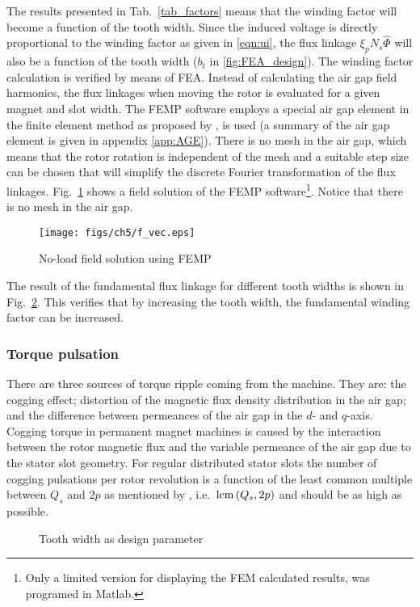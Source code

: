 The results presented in Tab.~\ref{tab_factors} means that the winding factor will become a function of the tooth width. Since the induced voltage is directly proportional to the winding factor as given in \eqref{eqn:ui}, the flux linkage $\xi_p N_s \hat{\Phi}$ will also be a function of the tooth width ($b_t$ in \ref{fig:FEA_design}). The winding factor calculation is verified by means of FEA. Instead of calculating the air gap field harmonics, the flux linkages when moving the rotor is evaluated for a given magnet and slot width. The FEMP software employs a special air gap element in the finite element method as proposed by \cite{razek_1981}, is used (a summary of the air gap element is given in appendix \ref{app:AGE}). There is no mesh in the air gap, which means that the rotor rotation is independent of the mesh and a suitable step size can be chosen that will simplify the discrete Fourier transformation of the flux linkages. Fig.~\ref{fig:fieldsol} shows a field solution of the FEMP software\footnote{Only a limited version for displaying the FEM calculated results, was programed in Matlab.}. Notice that there is no mesh in the air gap.  
\begin{figure}[htbp]
	\centering
		\texttt{[image: figs/ch5/f\_vec.eps]}
		\caption{No-load field solution using FEMP}
	\label{fig:fieldsol}
\end{figure}

The result of the fundamental flux linkage for different tooth widths is shown in Fig.~\ref{fig:Main_bt_design}. This verifies that by increasing the tooth width, the fundamental winding factor can be increased.

\subsubsection{Torque pulsation}\label{subsubsec:torque_pulsations}
There are three sources of torque ripple coming from the machine. They are: the cogging effect; distortion of the magnetic flux density distribution in the air gap; and the difference between permeances of the air gap in the $d$- and $q$-axis. Cogging torque in permanent magnet machines is caused by the interaction between the rotor magnetic flux and the variable permeance of the air gap due to the stator slot geometry. For regular distributed stator slots the number of cogging pulsations per rotor revolution is a function of the least common multiple between $Q_{s}$ and $2p$ as mentioned by \cite{cros_2002}, i.e.~$\textnormal{lcm}\left(Q_{s},2p\right)$ and should be as high as possible.
\begin{figure}[htbp]
	\centering
	
	
	\caption{Tooth width as design parameter}
	\label{fig:Main_bt_design}
\end{figure}

